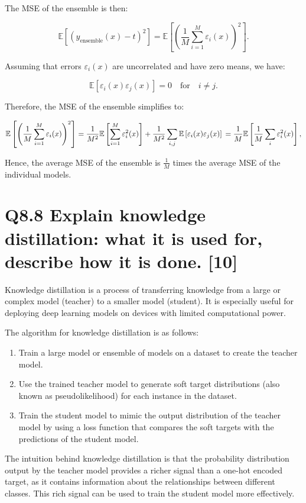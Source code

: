 \documentclass[11pt]{article}
\begin{document}
The MSE of the ensemble is then:

\[
\mathbb{E}\left[\left(y_{\text{ensemble}}(x) - t\right)^2\right] = \mathbb{E}\left[\left(\frac{1}{M} \sum_{i=1}^{M} \varepsilon_i(x)\right)^2\right].
\]

Assuming that errors \( \varepsilon_i(x) \) are uncorrelated and have zero means, we have:

\[
\mathbb{E}\left[\varepsilon_i(x)\varepsilon_j(x)\right] = 0 \quad \text{for} \quad i \neq j.
\]

Therefore, the MSE of the ensemble simplifies to:

\[
\mathbb{E}\left[\left(\frac{1}{M} \sum_{i=1}^{M} \varepsilon_i(x)\right)^2\right] = \frac{1}{M^2} \mathbb{E}\left[\sum_{i=1}^{M} \varepsilon_i^2(x)\right] + \frac{1}{M^2} \sum_{i, j} \mathbb{E}\left[\varepsilon_i(x)\varepsilon_j(x)\right] \\
= \frac{1}{M}\mathbb{E}\left[\frac{1}{M}\sum_{i}\varepsilon_{i}^{2}(x)\right],
\]

Hence, the average MSE of the ensemble is \( \frac{1}{M} \) times the average MSE of the individual models.

\section{Q8.8 Explain knowledge distillation: what it is used for, describe how it is done. [10]}

Knowledge distillation is a process of transferring knowledge from a large or complex model (teacher) to a smaller model (student). It is especially useful for deploying deep learning models on devices with limited computational power.

The algorithm for knowledge distillation is as follows:
\begin{enumerate}
    \item Train a large model or ensemble of models on a dataset to create the teacher model.
    \item Use the trained teacher model to generate soft target distributions (also known as pseudolikelihood) for each instance in the dataset.
    \item Train the student model to mimic the output distribution of the teacher model by using a loss function that compares the soft targets with the predictions of the student model.
\end{enumerate}

The intuition behind knowledge distillation is that the probability distribution output by the teacher model provides a richer signal than a one-hot encoded target, as it contains information about the relationships between different classes. This rich signal can be used to train the student model more effectively.
\end{document}

